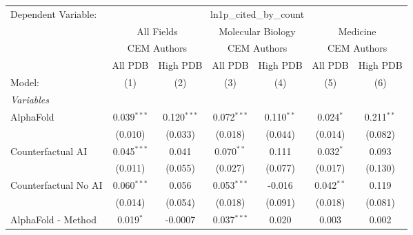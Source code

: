 \begingroup
\centering
\begin{tabular}{lcccccc}
   \tabularnewline \midrule \midrule
   Dependent Variable: & \multicolumn{6}{c}{ln1p\_cited\_by\_count}\\
 & \multicolumn{2}{c}{All Fields} & \multicolumn{2}{c}{Molecular Biology} & \multicolumn{2}{c}{Medicine} \\
\cmidrule(lr){2-3} \cmidrule(lr){4-5} \cmidrule(lr){6-7}
 & \multicolumn{2}{c}{CEM Authors} & \multicolumn{2}{c}{CEM Authors} & \multicolumn{2}{c}{CEM Authors} \\
\cmidrule(lr){2-3} \cmidrule(lr){4-5} \cmidrule(lr){6-7}
 & \multicolumn{1}{c}{All PDB} & \multicolumn{1}{c}{High PDB} & \multicolumn{1}{c}{All PDB} & \multicolumn{1}{c}{High PDB} & \multicolumn{1}{c}{All PDB} & \multicolumn{1}{c}{High PDB} \\
\cmidrule(lr){2-2} \cmidrule(lr){3-3} \cmidrule(lr){4-4} \cmidrule(lr){5-5} \cmidrule(lr){6-6} \cmidrule(lr){7-7}
   Model:                                                     & (1)            & (2)           & (3)           & (4)          & (5)            & (6)\\  
   \midrule
   \emph{Variables}\\
   AlphaFold                                                  & 0.039$^{***}$  & 0.120$^{***}$ & 0.072$^{***}$ & 0.110$^{**}$ & 0.024$^{*}$    & 0.211$^{**}$\\   
                                                              & (0.010)        & (0.033)       & (0.018)       & (0.044)      & (0.014)        & (0.082)\\   
   Counterfactual AI                                          & 0.045$^{***}$  & 0.041         & 0.070$^{**}$  & 0.111        & 0.032$^{*}$    & 0.093\\   
                                                              & (0.011)        & (0.055)       & (0.027)       & (0.077)      & (0.017)        & (0.130)\\   
   Counterfactual No AI                                       & 0.060$^{***}$  & 0.056         & 0.053$^{***}$ & -0.016       & 0.042$^{**}$   & 0.119\\   
                                                              & (0.014)        & (0.054)       & (0.018)       & (0.091)      & (0.018)        & (0.081)\\   
   AlphaFold - Method                                         & 0.019$^{*}$    & -0.0007       & 0.037$^{***}$ & 0.020        & 0.003          & 0.002\\   

\end{tabular}
